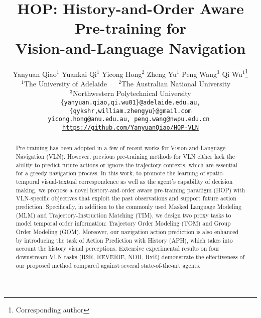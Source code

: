\documentclass[10pt,twocolumn,letterpaper]{article}
\begin{document}
\title{HOP: History-and-Order Aware Pre-training for\\
Vision-and-Language Navigation}


\author{
Yanyuan Qiao$^{1}$ \quad Yuankai Qi$^1$ \quad Yicong Hong$^2$ \quad Zheng Yu$^{1}$ \quad Peng Wang$^3$ \quad Qi Wu$^{1}$\thanks{Corresponding author}\\
$^1$The University of Adelaide ~~ $^2$The Australian National University ~~\\ $^3$Northwestern Polytechnical University\\
{\tt\small \{yanyuan.qiao,qi.wu01\}@adelaide.edu.au, \{qykshr,william.zhengyu\}@gmail.com} \\ 
{\tt\small yicong.hong@anu.edu.au, peng.wang@nwpu.edu.cn } \\
{\tt\small \href{https://github.com/YanyuanQiao/HOP-VLN}{https://github.com/YanyuanQiao/HOP-VLN}}
}



\maketitle

\vspace{-20pt}
\begin{abstract}
Pre-training has been adopted in a few of recent works for Vision-and-Language Navigation (VLN). However, previous pre-training methods for VLN either lack the ability to predict future actions or ignore the trajectory contexts, which are essential for a greedy navigation process. In this work, to promote the learning of spatio-temporal visual-textual correspondence as well as the agent's capability of decision making, we propose a novel history-and-order aware pre-training paradigm (HOP) with VLN-specific objectives that exploit the past observations and support future action prediction. Specifically, in addition to the commonly used Masked Language Modeling (MLM) and Trajectory-Instruction Matching (TIM), we design two proxy tasks to model temporal order information: Trajectory Order Modeling (TOM) and Group Order Modeling (GOM). Moreover, our navigation action prediction is also enhanced by introducing the task of Action Prediction with History (APH), which takes into account the history visual perceptions. Extensive experimental results on four downstream VLN tasks (R2R, REVERIE, NDH, RxR) demonstrate the effectiveness of our proposed method compared against several state-of-the-art agents.

\end{abstract}
\vspace{-20pt}
\end{document}
